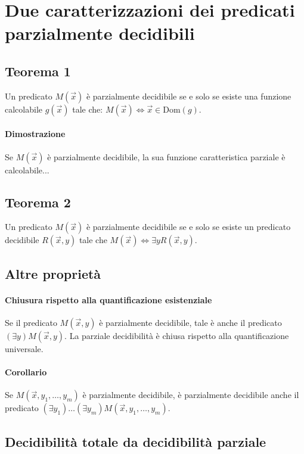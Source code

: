 \section{Due caratterizzazioni dei predicati parzialmente decidibili}

\subsection{Teorema 1}
Un predicato $M(\vec{x})$ è parzialmente decidibile se e solo se esiste una funzione calcolabile $g(\vec{x})$ tale che: $M(\vec{x}) \Leftrightarrow \vec{x} \in \mathrm{Dom}(g)$.

\paragraph{Dimostrazione} Se $M(\vec{x})$ è parzialmente decidibile, la sua funzione caratteristica parziale è calcolabile...

\subsection{Teorema 2} Un predicato $M(\vec{x})$ è parzialmente decidibile se e solo se esiste un predicato decidibile $R(\vec{x},y)$ tale che $M(\vec{x}) \Leftrightarrow \exists yR(\vec{x},y)$.

\subsection{Altre proprietà}

\paragraph{Chiusura rispetto alla quantificazione esistenziale}
Se il predicato $M(\vec{x}, y)$ è parzialmente decidibile, tale è anche il predicato $(\exists y) M(\vec{x}, y)$. La parziale decidibilità è chiusa rispetto alla quantificazione universale.

\paragraph{Corollario}

Se $M(\vec{x}, y_1, \dots, y_m)$ è parzialmente decidibile, è parzialmente decidibile anche il predicato $(\exists y_1)\dots(\exists y_m) M (\vec{x}, y_1, \dots, y_m)$.


\subsection{Decidibilità totale da decidibilità parziale}

